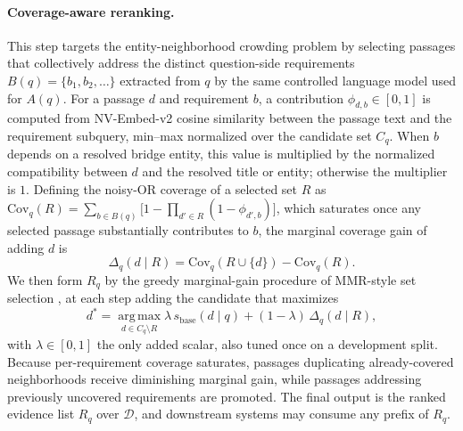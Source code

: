 \paragraph{Coverage-aware reranking.}
This step targets the entity-neighborhood crowding problem by
selecting passages that collectively address the distinct
question-side requirements $B(q)=\{b_1,b_2,\ldots\}$ extracted from
$q$ by the same controlled language model used for $A(q)$. For a
passage $d$ and requirement $b$, a contribution
$\phi_{d,b}\in[0,1]$ is computed from NV-Embed-v2 cosine similarity
between the passage text and the requirement subquery, min--max
normalized over the candidate set $C_q$. When $b$ depends on a resolved
bridge entity, this value is multiplied by the normalized compatibility
between $d$ and the resolved title or entity; otherwise the multiplier
is $1$. Defining the noisy-OR coverage of a selected set $R$ as
$\mathrm{Cov}_q(R)=\sum_{b\in B(q)}\bigl[1-\prod_{d'\in R}(1-\phi_{d',b})\bigr]$,
which saturates once any selected passage substantially contributes
to $b$, the marginal coverage gain of adding $d$ is
\begin{equation}
\label{eq:marginal-gain}
\Delta_q(d \mid R) = \mathrm{Cov}_q(R\cup\{d\}) - \mathrm{Cov}_q(R).
\end{equation}
We then form $R_q$ by the greedy marginal-gain procedure of MMR-style set selection
\citep{carbonell1998mmr,lin2011submodular}, at each step adding the
candidate that maximizes
\begin{equation}
\label{eq:greedy-rerank}
d^{*}
=
\operatorname*{arg\,max}_{d \in C_q \setminus R}
\lambda\,s_{\mathrm{base}}(d \mid q)
+
(1-\lambda)\,\Delta_q(d \mid R),
\end{equation}
with $\lambda \in [0,1]$ the only added scalar, also tuned once on a
development split. Because per-requirement coverage saturates,
passages duplicating already-covered neighborhoods receive
diminishing marginal gain, while passages addressing previously
uncovered requirements are promoted. The final output is the ranked
evidence list $R_q$ over $\mathcal{D}$, and downstream systems may
consume any prefix of $R_q$.
